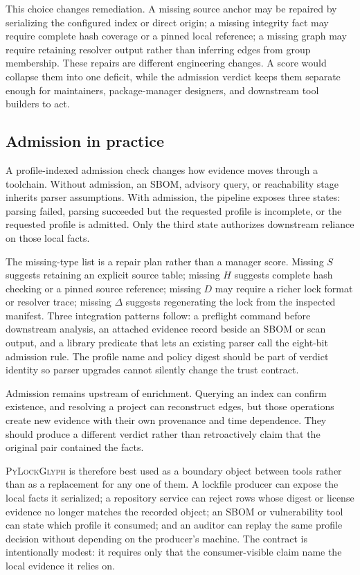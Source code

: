 \documentclass[10pt,conference]{IEEEtran}
\newcommand{\tool}{\textsc{PyLockGlyph}}
\begin{document}
This choice changes remediation. A missing source anchor may be repaired by serializing the configured index or direct origin; a missing integrity fact may require complete hash coverage or a pinned local reference; a missing graph may require retaining resolver output rather than inferring edges from group membership. These repairs are different engineering changes. A score would collapse them into one deficit, while the admission verdict keeps them separate enough for maintainers, package-manager designers, and downstream tool builders to act.



\subsection{Admission in practice}
A profile-indexed admission check changes how evidence moves through a toolchain. Without admission, an SBOM, advisory query, or reachability stage inherits parser assumptions. With admission, the pipeline exposes three states: parsing failed, parsing succeeded but the requested profile is incomplete, or the requested profile is admitted. Only the third state authorizes downstream reliance on those local facts.

The missing-type list is a repair plan rather than a manager score. Missing $S$ suggests retaining an explicit source table; missing $H$ suggests complete hash checking or a pinned source reference; missing $D$ may require a richer lock format or resolver trace; missing $\Delta$ suggests regenerating the lock from the inspected manifest. Three integration patterns follow: a preflight command before downstream analysis, an attached evidence record beside an SBOM or scan output, and a library predicate that lets an existing parser call the eight-bit admission rule. The profile name and policy digest should be part of verdict identity so parser upgrades cannot silently change the trust contract.

Admission remains upstream of enrichment. Querying an index can confirm existence, and resolving a project can reconstruct edges, but those operations create new evidence with their own provenance and time dependence. They should produce a different verdict rather than retroactively claim that the original pair contained the facts.

\tool{} is therefore best used as a boundary object between tools rather than as a replacement for any one of them. A lockfile producer can expose the local facts it serialized; a repository service can reject rows whose digest or license evidence no longer matches the recorded object; an SBOM or vulnerability tool can state which profile it consumed; and an auditor can replay the same profile decision without depending on the producer's machine. The contract is intentionally modest: it requires only that the consumer-visible claim name the local evidence it relies on.
\end{document}
